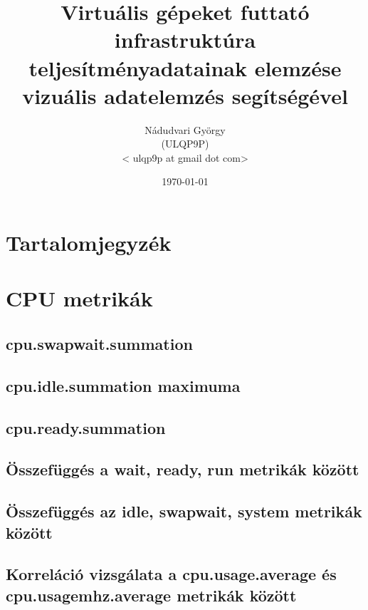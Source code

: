 \documentclass[a4paper,10pt,titlepage]{article}
\newcommand{\szerzo}{Nádudvari György}
\newcommand{\szerzoneptun}{ULQP9P}
\newcommand{\szerzomail}{ulqp9p at gmail dot com}
\newcommand{\cim}{Virtuális gépeket futtató infrastruktúra teljesítményadatainak elemzése vizuális adatelemzés segítségével}
\begin{document}

\begin{titlepage}
    \title{\cim}
    \author{\szerzo \\ (\szerzoneptun) \\ < \szerzomail >}
    \date{\today}
\end{titlepage}
\maketitle

\section*{Tartalomjegyzék}
\makeatletter
{}
\makeatother

\section{CPU metrikák}
\subsection{cpu.swapwait.summation}
\subsection{cpu.idle.summation maximuma}
\subsection{cpu.ready.summation}
\subsection{Összefüggés a wait, ready, run metrikák között}
\subsection{Összefüggés az idle, swapwait, system metrikák között}
\subsection{Korreláció vizsgálata a cpu.usage.average és cpu.usagemhz.average metrikák között}
\end{document}
